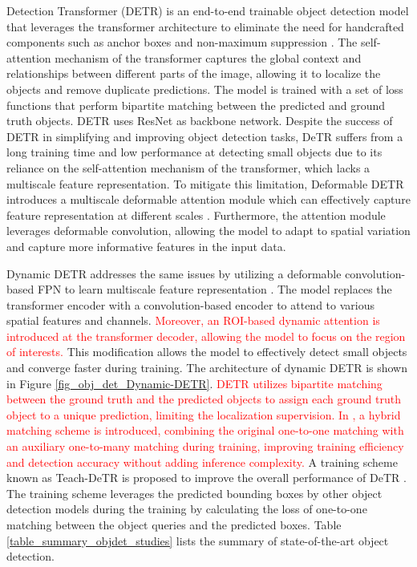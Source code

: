 \documentclass[preprint,12pt]{elsarticle}
\begin{document}
Detection Transformer (DETR) is an end-to-end trainable object detection model that leverages the transformer architecture to eliminate the need for handcrafted components such as anchor boxes and non-maximum suppression \citep{carion_end_end_2020}. The self-attention mechanism of the transformer captures the global context and relationships between different parts of the image, allowing it to localize the objects and remove duplicate predictions. The model is trained with a set of loss functions that perform bipartite matching between the predicted and ground truth objects. DETR uses ResNet as backbone network. Despite the success of DETR in simplifying and improving object detection tasks, DeTR suffers from a long training time and low performance at detecting small objects due to its reliance on the self-attention mechanism of the transformer, which lacks a multiscale feature representation. To mitigate this limitation, Deformable DETR introduces a multiscale deformable attention module which can effectively capture feature representation at different scales \citep{zhu_deformable_2020}. Furthermore, the attention module leverages deformable convolution, allowing the model to adapt to spatial variation and capture more informative features in the input data. 

Dynamic DETR addresses the same issues by utilizing a deformable convolution-based FPN to learn multiscale feature representation \citep{dai_dynamic_2021}. The model replaces the transformer encoder with a convolution-based encoder to attend to various spatial features and channels. \textcolor{red}{Moreover, an ROI-based dynamic attention is introduced at the transformer decoder, allowing the model to focus on the region of interests.} This modification allows the model to effectively detect small objects and converge faster during training. The architecture of dynamic DETR is shown in Figure \ref{fig_obj_det_Dynamic-DETR}. \textcolor{red}{DETR utilizes bipartite matching between the ground truth and the predicted objects to assign each ground truth object to a unique prediction, limiting the localization supervision. In \citep{jia_detrs_2023}, a hybrid matching scheme is introduced, combining the original one-to-one matching with an auxiliary one-to-many matching during training, improving training efficiency and detection accuracy without adding inference complexity.} A training scheme known as Teach-DeTR is proposed to improve the overall performance of DeTR \citep{huang_teach-detr_2023}. The training scheme leverages the predicted bounding boxes by other object detection models during the training by calculating the loss of one-to-one matching between the object queries and the predicted boxes. Table \ref{table_summary_objdet_studies} lists the summary of state-of-the-art object detection.
\end{document}
